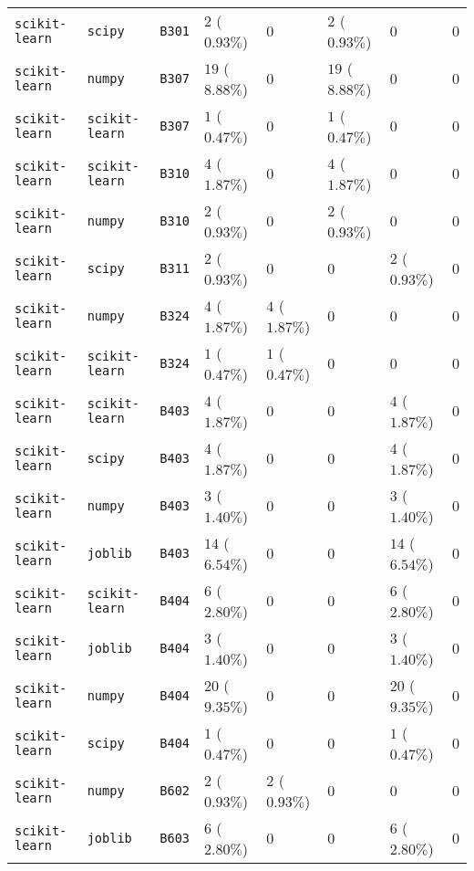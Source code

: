 \begin{table}
\begin{tabular}{llllllll}
\texttt{scikit-learn} & \texttt{scipy} & \texttt{B301} & $2$ ($0.93\%$) & $0$ & $2$ ($0.93\%$) & $0$ & $0$ \\
\texttt{scikit-learn} & \texttt{numpy} & \texttt{B307} & $19$ ($8.88\%$) & $0$ & $19$ ($8.88\%$) & $0$ & $0$ \\
\texttt{scikit-learn} & \texttt{scikit-learn} & \texttt{B307} & $1$ ($0.47\%$) & $0$ & $1$ ($0.47\%$) & $0$ & $0$ \\
\texttt{scikit-learn} & \texttt{scikit-learn} & \texttt{B310} & $4$ ($1.87\%$) & $0$ & $4$ ($1.87\%$) & $0$ & $0$ \\
\texttt{scikit-learn} & \texttt{numpy} & \texttt{B310} & $2$ ($0.93\%$) & $0$ & $2$ ($0.93\%$) & $0$ & $0$ \\
\texttt{scikit-learn} & \texttt{scipy} & \texttt{B311} & $2$ ($0.93\%$) & $0$ & $0$ & $2$ ($0.93\%$) & $0$ \\
\texttt{scikit-learn} & \texttt{numpy} & \texttt{B324} & $4$ ($1.87\%$) & $4$ ($1.87\%$) & $0$ & $0$ & $0$ \\
\texttt{scikit-learn} & \texttt{scikit-learn} & \texttt{B324} & $1$ ($0.47\%$) & $1$ ($0.47\%$) & $0$ & $0$ & $0$ \\
\texttt{scikit-learn} & \texttt{scikit-learn} & \texttt{B403} & $4$ ($1.87\%$) & $0$ & $0$ & $4$ ($1.87\%$) & $0$ \\
\texttt{scikit-learn} & \texttt{scipy} & \texttt{B403} & $4$ ($1.87\%$) & $0$ & $0$ & $4$ ($1.87\%$) & $0$ \\
\texttt{scikit-learn} & \texttt{numpy} & \texttt{B403} & $3$ ($1.40\%$) & $0$ & $0$ & $3$ ($1.40\%$) & $0$ \\
\texttt{scikit-learn} & \texttt{joblib} & \texttt{B403} & $14$ ($6.54\%$) & $0$ & $0$ & $14$ ($6.54\%$) & $0$ \\
\texttt{scikit-learn} & \texttt{scikit-learn} & \texttt{B404} & $6$ ($2.80\%$) & $0$ & $0$ & $6$ ($2.80\%$) & $0$ \\
\texttt{scikit-learn} & \texttt{joblib} & \texttt{B404} & $3$ ($1.40\%$) & $0$ & $0$ & $3$ ($1.40\%$) & $0$ \\
\texttt{scikit-learn} & \texttt{numpy} & \texttt{B404} & $20$ ($9.35\%$) & $0$ & $0$ & $20$ ($9.35\%$) & $0$ \\
\texttt{scikit-learn} & \texttt{scipy} & \texttt{B404} & $1$ ($0.47\%$) & $0$ & $0$ & $1$ ($0.47\%$) & $0$ \\
\texttt{scikit-learn} & \texttt{numpy} & \texttt{B602} & $2$ ($0.93\%$) & $2$ ($0.93\%$) & $0$ & $0$ & $0$ \\
\texttt{scikit-learn} & \texttt{joblib} & \texttt{B603} & $6$ ($2.80\%$) & $0$ & $0$ & $6$ ($2.80\%$) & $0$ \\

\end{tabular}
\end{table}
